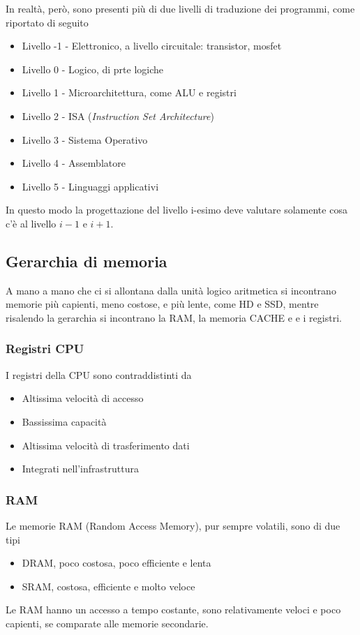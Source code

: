 \documentclass[a4paper]{extarticle}
\begin{document}
In realtà, però, sono presenti più di due livelli di traduzione dei programmi, come riportato di seguito
\begin{itemize}
    \item Livello -1 - Elettronico, a livello circuitale: transistor, mosfet
    \item Livello 0 - Logico, di prte logiche
    \item Livello 1 - Microarchitettura, come ALU e registri
    \item Livello 2 - ISA (\textit{Instruction Set Architecture})
    \item Livello 3 - Sistema Operativo
    \item Livello 4 - Assemblatore
    \item Livello 5 - Linguaggi applicativi
\end{itemize}
In questo modo la progettazione del livello i-esimo deve valutare solamente cosa c'è al livello \(i - 1\) e \(i + 1\).

\vspace{1em}
\subsection{Gerarchia di memoria}
A mano a mano che ci si allontana dalla unità logico aritmetica si incontrano memorie più capienti, meno costose, e più lente, come HD e SSD, mentre risalendo la gerarchia si incontrano la RAM, la memoria CACHE e e i registri.

\vspace{1em}
\subsubsection{Registri CPU}
I registri della CPU sono contraddistinti da
\begin{itemize}
    \item Altissima velocità di accesso
    \item Bassissima capacità
    \item Altissima velocità di trasferimento dati
    \item Integrati nell'infrastruttura
\end{itemize}

\vspace{1em}
\subsubsection{RAM}
Le memorie RAM (Random Access Memory), pur sempre volatili, sono di due tipi
\begin{itemize}
    \item DRAM, poco costosa, poco efficiente e lenta
    \item SRAM, costosa, efficiente e molto veloce
\end{itemize}
Le RAM hanno un accesso a tempo costante, sono relativamente veloci e poco capienti, se comparate alle memorie secondarie.
\end{document}
